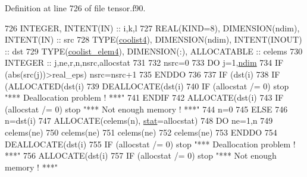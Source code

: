 Definition at line 726 of file tensor.\+f90.


\begin{DoxyCode}
726     \textcolor{keywordtype}{INTEGER}, \textcolor{keywordtype}{INTENT(IN)} :: i,k,l
727     \textcolor{keywordtype}{REAL(KIND=8)}, \textcolor{keywordtype}{DIMENSION(ndim)}, \textcolor{keywordtype}{INTENT(IN)} :: src
728     \textcolor{keywordtype}{TYPE}(\hyperlink{structtensor_1_1coolist4}{coolist4}), \textcolor{keywordtype}{DIMENSION(ndim)}, \textcolor{keywordtype}{INTENT(INOUT)} :: dst
729     \textcolor{keywordtype}{TYPE}(\hyperlink{structtensor_1_1coolist__elem4}{coolist\_elem4}), \textcolor{keywordtype}{DIMENSION(:)}, \textcolor{keywordtype}{ALLOCATABLE} :: celems
730     \textcolor{keywordtype}{INTEGER} :: j,ne,r,n,nsrc,allocstat
731 
732     nsrc=0
733     \textcolor{keywordflow}{DO} j=1,\hyperlink{namespaceparams_a2323fe1773f086e20c14f266351c482b}{ndim}
734        \textcolor{keywordflow}{IF} (abs(src(j))>real\_eps) nsrc=nsrc+1
735 \textcolor{keywordflow}{    ENDDO}
736 
737     \textcolor{keywordflow}{IF} (dst(i)%
738        \textcolor{keywordflow}{IF} (\textcolor{keyword}{ALLOCATED}(dst(i)%
739           \textcolor{keyword}{DEALLOCATE}(dst(i)%
740           \textcolor{keywordflow}{IF} (allocstat /= 0) stop \textcolor{stringliteral}{"*** Deallocation problem ! ***"}
741 \textcolor{keywordflow}{       ENDIF}
742        \textcolor{keyword}{ALLOCATE}(dst(i)%
743        \textcolor{keywordflow}{IF} (allocstat /= 0) stop \textcolor{stringliteral}{"*** Not enough memory ! ***"}
744        n=0
745     \textcolor{keywordflow}{ELSE}
746        n=dst(i)%
747        \textcolor{keyword}{ALLOCATE}(celems(n), \hyperlink{namespacestat}{stat}=allocstat)
748        \textcolor{keywordflow}{DO} ne=1,n
749           celems(ne)%
750           celems(ne)%
751           celems(ne)%
752           celems(ne)%
753 \textcolor{keywordflow}{       ENDDO}
754        \textcolor{keyword}{DEALLOCATE}(dst(i)%
755        \textcolor{keywordflow}{IF} (allocstat /= 0) stop \textcolor{stringliteral}{"*** Deallocation problem ! ***"}
756        \textcolor{keyword}{ALLOCATE}(dst(i)%
757        \textcolor{keywordflow}{IF} (allocstat /= 0) stop \textcolor{stringliteral}{"*** Not enough memory ! ***"}

\end{DoxyCode}
